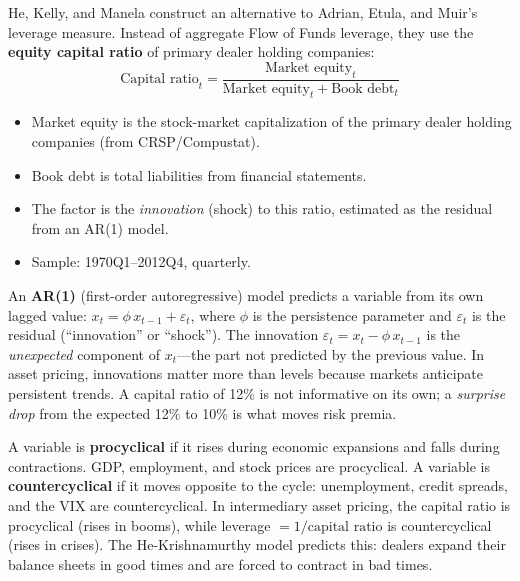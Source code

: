 He, Kelly, and Manela construct an alternative to Adrian, Etula, and Muir's leverage measure. Instead of aggregate Flow of Funds leverage, they use the \textbf{equity capital ratio} of primary dealer holding companies:
\begin{equation}
\text{Capital ratio}_t = \frac{\text{Market equity}_t}{\text{Market equity}_t + \text{Book debt}_t}
\label{eq:hkm-capital-ratio}
\end{equation}
\begin{itemize}[nosep]
  \item Market equity is the stock-market capitalization of the primary dealer holding companies (from CRSP/Compustat).
  \item Book debt is total liabilities from financial statements.
  \item The factor is the \emph{innovation} (shock) to this ratio, estimated as the residual from an AR(1) model.
  \item Sample: 1970Q1--2012Q4, quarterly.
\end{itemize}

\begin{prereq}
An \textbf{AR(1)} (first-order autoregressive) model predicts a variable from its own lagged value: $x_t = \phi \, x_{t-1} + \varepsilon_t$, where $\phi$ is the persistence parameter and $\varepsilon_t$ is the residual (``innovation'' or ``shock''). The innovation $\varepsilon_t = x_t - \phi \, x_{t-1}$ is the \emph{unexpected} component of $x_t$---the part not predicted by the previous value. In asset pricing, innovations matter more than levels because markets anticipate persistent trends. A capital ratio of 12\% is not informative on its own; a \emph{surprise drop} from the expected 12\% to 10\% is what moves risk premia.
\end{prereq}

\begin{prereq}
A variable is \textbf{procyclical} if it rises during economic expansions and falls during contractions. GDP, employment, and stock prices are procyclical. A variable is \textbf{countercyclical} if it moves opposite to the cycle: unemployment, credit spreads, and the VIX are countercyclical. In intermediary asset pricing, the capital ratio is procyclical (rises in booms), while leverage $= 1/\text{capital ratio}$ is countercyclical (rises in crises). The He-Krishnamurthy model predicts this: dealers expand their balance sheets in good times and are forced to contract in bad times.
\end{prereq}

